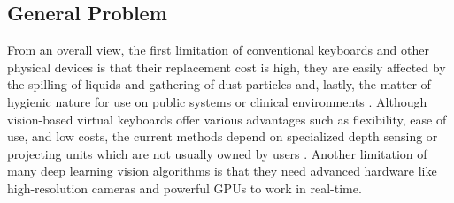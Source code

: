 \subsection{General Problem}
\label{subsec:general_problem}
From an overall view, the first limitation of conventional keyboards and other physical devices is that their replacement cost is high, they are easily affected by the spilling of liquids and gathering of dust particles and, lastly, the matter of hygienic nature for use on public systems or clinical environments \cite{ReviewVirtualKeyboard2020}. Although vision-based virtual keyboards offer various advantages such as flexibility, ease of use, and low costs, the current methods depend on specialized depth sensing or projecting units which are not usually owned by users \cite{Lee2019Virtual, Pilkov2024Markerless}. Another limitation of many deep learning vision algorithms is that they need advanced hardware like high-resolution cameras and powerful GPUs to work in real-time.


